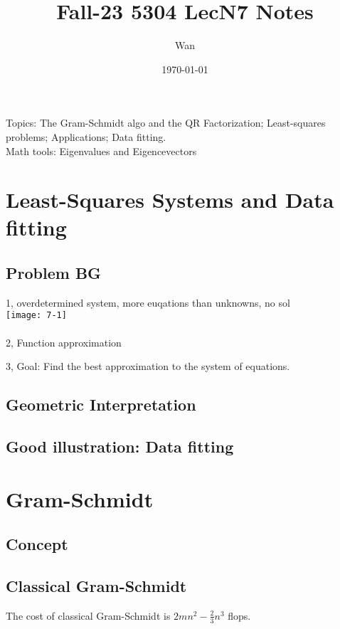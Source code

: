 \documentclass{article}
\begin{document}
\title{Fall-23 5304 LecN7 Notes}
\author{Wan}
\date{\today}
\maketitle

\noindent
Topics: The Gram-Schmidt algo and the QR Factorization; Least-squares problems; Applications; Data fitting.\\


\noindent
Math tools: Eigenvalues and Eigencevectors

\section{Least-Squares Systems and Data fitting}
\subsection*{Problem BG}
1, overdetermined system, more euqations than unknowns, no sol\\
\texttt{[image: 7-1]}\\
\\
2, Function approximation

3, Goal: Find the best approximation to the system of equations.\\

\subsection*{Geometric Interpretation}

\subsection*{Good illustration: Data fitting}


\pagebreak
\section{Gram-Schmidt}
\subsection{Concept}

\subsection{Classical Gram-Schmidt}

The cost of classical Gram-Schmidt is $2mn^2 - \frac{2}{3}n^3$ flops.\\
\end{document}
